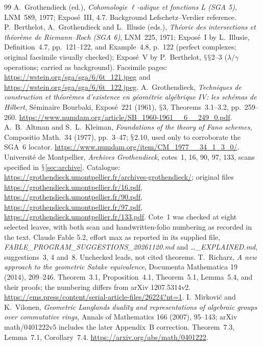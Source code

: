 \documentclass[11pt,a4paper]{article}
\renewcommand{\S}{\ensuremath{\mathsection}}
\theoremstyle{named}\newtheorem{finding}{Finding}[section]
\theoremstyle{definition}\newtheorem{definition}[finding]{Definition}
\theoremstyle{remark}\newtheorem{remark}[finding]{Remark}
\begin{document}
\begin{thebibliography}{99}
 A.~Grothendieck (ed.), \emph{Cohomologie \(\ell\)-adique et fonctions L (SGA 5)}, LNM~589, 1977; Expos\'e~III, 4.7. Background Lefschetz--Verdier reference.
 P.~Berthelot, A.~Grothendieck and L.~Illusie (eds.), \emph{Th\'eorie des intersections et th\'eor\`eme de Riemann--Roch (SGA 6)}, LNM~225, 1971; Expos\'e~I by L.~Illusie, Definition~4.7, pp.~121--122, and Example~4.8, p.~122 (perfect complexes; original facsimile visually checked); Expos\'e~V by P.~Berthelot, \S\S2--3 ($\lambda/\gamma$ operations; carried as background). Facsimile pages: \url{https://wstein.org/sga/sga/6/6t_121.jpeg} and \url{https://wstein.org/sga/sga/6/6t_122.jpeg}.
 A.~Grothendieck, \emph{Techniques de construction et th\'eor\`emes d'existence en g\'eom\'etrie alg\'ebrique IV: les sch\'emas de Hilbert}, S\'eminaire Bourbaki, Expos\'e~221 (1961), \S3, Theorems~3.1--3.2, pp.~259--260. \url{https://www.numdam.org/article/SB_1960-1961__6__249_0.pdf}.
 A.~B.~Altman and S.~L.~Kleiman, \emph{Foundations of the theory of Fano schemes}, Compositio Math.~34 (1977), pp.~3--47; \S2.10, used only to corroborate the SGA~6 locator. \url{https://www.numdam.org/item/CM_1977__34_1_3_0/}.
 Universit\'e de Montpellier, \emph{Archives Grothendieck}, cotes~1, 16, 90, 97, 133, scans specified in \S\ref{sec:archive}. Catalogue: \url{https://grothendieck.umontpellier.fr/archives-grothendieck/}; original files \url{https://grothendieck.umontpellier.fr/16.pdf}, \url{https://grothendieck.umontpellier.fr/90.pdf}, \url{https://grothendieck.umontpellier.fr/97.pdf}, \url{https://grothendieck.umontpellier.fr/133.pdf}. Cote~1 was checked at eight selected leaves, with both scan and handwritten-folio numbering as recorded in the text.
 Claude Fable 5.2, effort max as reported in its supplied file, \emph{FABLE\_PROGRAM\_SUGGESTIONS\_20261120.md} and \emph{\ldots\_EXPLAINED.md}, suggestions~3, 4 and~8. Unchecked leads, not cited theorems.
 T.~Richarz, \emph{A new approach to the geometric Satake equivalence}, Documenta Mathematica 19 (2014), 209--246. Theorem~3.1, Proposition~4.1, Theorem~5.1, Lemma~5.4, and their proofs; the numbering differs from arXiv 1207.5314v2. \url{https://ems.press/content/serial-article-files/26224?nt=1}.
 I.~Mirkovi\'c and K.~Vilonen, \emph{Geometric Langlands duality and representations of algebraic groups over commutative rings}, Annals of Mathematics 166 (2007), 95--143; arXiv math/0401222v5 includes the later Appendix~B correction. Theorem~7.3, Lemma~7.1, Corollary~7.4. \url{https://arxiv.org/abs/math/0401222}.

\end{thebibliography}
\end{document}
